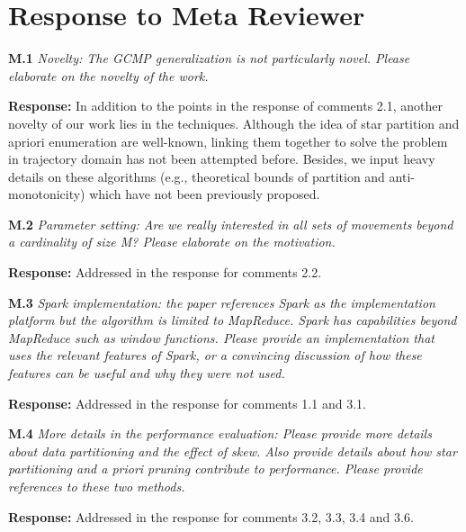 \section{Response to Meta Reviewer}

\textbf{M.1} \emph{Novelty: The GCMP generalization is not particularly novel. Please elaborate on the novelty of the work.}

\textbf{Response:} In addition to the points in the response of comments 2.1, another novelty of our work lies in the 
techniques. 
Although the idea of star partition and apriori enumeration are well-known, 
linking them together to solve the problem in trajectory domain has not been attempted before.
Besides, we input heavy details on these algorithms (e.g., theoretical bounds of partition and
anti-monotonicity) which have not been previously proposed.


\textbf{M.2} \emph{Parameter setting: Are we really interested in all sets of movements beyond a cardinality of size M? Please elaborate
on the motivation.}

\textbf{Response:} Addressed in the response for comments 2.2. 

\textbf{M.3} \emph{Spark implementation: the paper references Spark as the implementation platform but the algorithm is limited to MapReduce. Spark has capabilities beyond MapReduce such as window functions. Please provide an implementation that uses the relevant features of Spark, or a convincing discussion of how these features can be useful and why they were not used.}

\textbf{Response:} Addressed in the response for comments 1.1 and 3.1.

\textbf{M.4} \emph{More details in the performance evaluation: Please provide more details about data partitioning and the effect of skew. Also provide details about how star partitioning and a priori pruning contribute to performance. Please provide references to these two methods.}

\textbf{Response:} Addressed in the response for comments 3.2, 3.3, 3.4 and 3.6.
